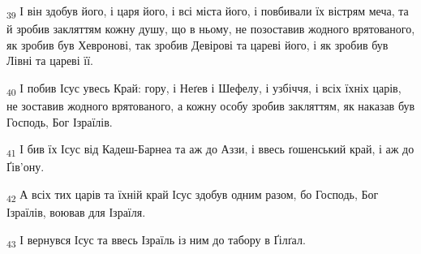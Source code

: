 \begin{tcolorbox}
\textsubscript{39} І він здобув його, і царя його, і всі міста його, і повбивали їх вістрям меча, та й зробив закляттям кожну душу, що в ньому, не позоставив жодного врятованого, як зробив був Хевронові, так зробив Девірові та цареві його, і як зробив був Лівні та цареві її.
\end{tcolorbox}
\begin{tcolorbox}
\textsubscript{40} І побив Ісус увесь Край: гору, і Неґев і Шефелу, і узбіччя, і всіх їхніх царів, не зоставив жодного врятованого, а кожну особу зробив закляттям, як наказав був Господь, Бог Ізраїлів.
\end{tcolorbox}
\begin{tcolorbox}
\textsubscript{41} І бив їх Ісус від Кадеш-Барнеа та аж до Аззи, і ввесь ґошенський край, і аж до Ґів'ону.
\end{tcolorbox}
\begin{tcolorbox}
\textsubscript{42} А всіх тих царів та їхній край Ісус здобув одним разом, бо Господь, Бог Ізраїлів, воював для Ізраїля.
\end{tcolorbox}
\begin{tcolorbox}
\textsubscript{43} І вернувся Ісус та ввесь Ізраїль із ним до табору в Ґілґал.
\end{tcolorbox}
